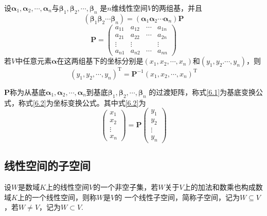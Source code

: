     \begin{theorem}
        设$\boldsymbol{\alpha}_1,\boldsymbol{\alpha}_2,\cdots,\boldsymbol{\alpha}_n$与$\boldsymbol{\beta}_1,\boldsymbol{\beta}_2,\cdots,\boldsymbol{\beta}_n$
        是$n$维线性空间$V$的两组基，并且
        \begin{equation}\label{6.1}\tag{6.1}
        (\boldsymbol{\beta}_1\boldsymbol{\beta}_2\cdots\boldsymbol{\beta}_n)=(\boldsymbol{\alpha}_1\boldsymbol{\alpha}_2\cdots\boldsymbol{\alpha}_n)\boldsymbol{P}
        \end{equation}
        $$\boldsymbol{P}=\left(\begin{array}{cccc}
            a_{11} & a_{12} & \cdots & a_{1n}\\
            a_{21} & a_{22} & \cdots & a_{2n}\\
            \vdots & \vdots & &\vdots\\
            a_{n1} & a_{n2} & \cdots & a_{nn}
        \end{array}\right)$$
        若$V$中任意元素$\boldsymbol{\alpha}$在这两组基下的坐标分别是$(x_1,x_2,\cdots,x_n)$和$(y_1,y_2.\cdots,y_n)$，则
        $${(y_1,y_2,\cdots,y_n)}^\mathrm{T}=\boldsymbol{P}^\mathrm{-1}{(x_1,x_2,\cdots,x_n)}^\mathrm{T}$$

        $\boldsymbol{P}$称为从基底$\boldsymbol{\alpha}_1,\boldsymbol{\alpha}_2,\cdots,\boldsymbol{\alpha}_n$到基底$\boldsymbol{\beta}_1,\boldsymbol{\beta}_2,\cdots,\boldsymbol{\beta}_n$
        的{\heiti 过渡矩阵}，称式\eqref{6.1}为{\heiti 基底变换公式}，称式\eqref{6.2}为{\heiti 坐标变换公式}。其中式\eqref{6.2}为
        \begin{equation}\label{6.2}\tag{6.2}
            \left(\begin{array}{c}
                x_1\\
                x_2\\
                \vdots\\
                x_n
            \end{array}\right)=\boldsymbol{P}\left(\begin{array}{c}
                y_1\\
                y_2\\
                \vdots\\
                y_n
            \end{array}\right)
        \end{equation}
    \end{theorem}

\subsection{线性空间的子空间}
    \begin{definition}[子空间]
        设$W$是数域$K$上的线性空间$V$的一个非空子集，若$W$关于$V$上的加法和数乘也构成数域$K$上的一个线性空间，则称$W$是$V$的
        一个{\heiti 线性子空间}，简称{\heiti 子空间}，记为$W\subseteq V$，若$W\neq V$，记为$W\subset V$.
    \end{definition}

